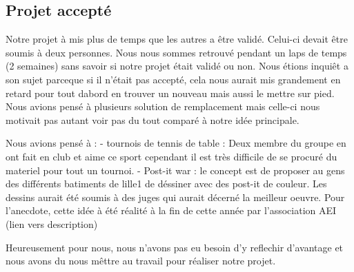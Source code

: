 \subsection{Projet accepté}%
\label{sub:projet_accepte}

Notre projet à mis plus de temps que les autres a être validé.
Celui-ci devait être soumis à deux personnes. Nous nous sommes retrouvé
pendant un laps de temps (2 semaines) sans savoir si notre projet était
validé ou non. Nous étions inquiêt a son sujet parceque si il n'était
pas accepté, cela nous aurait mis grandement en retard pour tout dabord
en trouver un nouveau mais aussi le mettre sur pied. Nous avions pensé à
plusieurs solution de remplacement mais celle-ci nous motivait pas
autant voir pas du tout comparé à notre idée principale.

Nous avions pensé à :
  - tournois de tennis de table : Deux membre du groupe en ont fait
en club et aime ce sport cependant il est très difficile de se procuré
du materiel pour tout un tournoi.
  - Post-it war : le concept est de proposer au gens des différents
batiments de lille1 de déssiner avec des post-it de couleur. Les dessins
aurait été soumis à des juges qui aurait décerné la meilleur oeuvre.
Pour l'anecdote, cette idée à été réalité à la fin de cette année par
l'association AEI (lien vers description)

Heureusement pour nous, nous n'avons pas eu besoin d'y reflechir
d'avantage et nous avons du nous mêttre au travail pour réaliser notre
projet.

